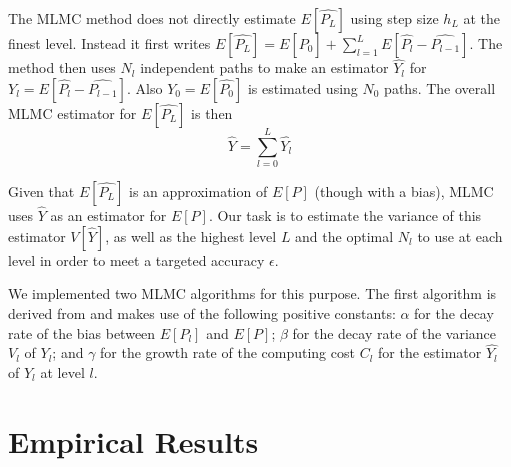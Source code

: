 \documentclass{article}
\begin{document}
	The MLMC method does not directly estimate $E[\widehat{P_L}]$ using step size $h_L$ at the finest level. Instead it first writes $E[\widehat{P_L}] = E[\widehat{P_0}] + \sum_{l=1}^L E[\widehat{P_l} - \widehat{P_{l-1}}]$. The method then uses $N_l$ independent paths to make an estimator $\widehat{Y_l}$ for $Y_l = E[\widehat{P_l} - \widehat{P_{l-1}}]$. Also $Y_0 = E[\widehat{P_0}]$ is estimated using $N_0$ paths. The overall MLMC estimator for $E[\widehat{P_L}]$ is then
	$$\widehat{Y} = \sum_{l=0}^L \widehat{Y_l}$$
	
	Given that $E[\widehat{P_L}]$ is an approximation of $E[P]$ (though with a bias), MLMC uses $\widehat{Y}$ as an estimator for $E[P]$. Our task is to estimate the variance of this estimator $V[\widehat{Y}]$, as well as the highest level $L$ and the optimal $N_l$ to use at each level in order to meet a targeted accuracy $\epsilon$.
	
	We implemented two MLMC algorithms for this purpose. The first algorithm is derived from \cite{giles15} and makes use of the following positive constants: $\alpha$ for the decay rate of the bias between $E[P_l]$ and $E[P]$; $\beta$ for the decay rate of the variance $V_l$ of $Y_l$; and $\gamma$ for the growth rate of the computing cost $C_l$ for the estimator $\widehat{Y_l}$ of $Y_l$ at level $l$.
		
	
	
\section{Empirical Results}



\end{document}
